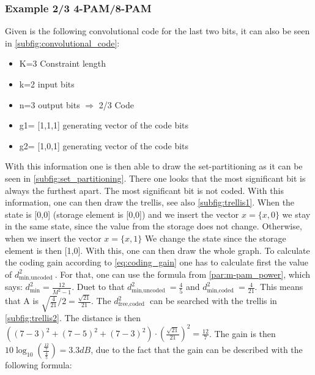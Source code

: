 \subsubsection{Example 2/3 4-PAM/8-PAM}\label{sbusubsec:example_pam}
Given is the following convolutional code for the last two bits, it can also be seen in \autoref{subfig:convolutional_code}:
\begin{itemize}
    \item K=3 Constraint length
    \item k=2 input bits
    \item n=3 output bits $\Rightarrow$ 2/3 Code
    \item g1= [1,1,1] generating vector of the code bits
    \item g2= [1,0,1] generating vector of the code bits
\end{itemize}
With this information one is then able to draw the set-partitioning as it can be seen in \autoref{subfig:set_partitioning}. There one looks that the most significant bit is always the furthest apart. The most significant bit is not coded.\newline
With this information, one can then draw the trellis, see also \autoref{subfig:trellis1}. When the state is [0,0] (storage element is [0,0]) and we insert the vector $x=\{x,0\}$ we stay in the same state, since the value from the storage does not change. Otherwise, when we insert the vector $x=\{x,1\}$ We change the state since the storage element is then [1,0]. With this, one can then draw the whole graph.\newline
To calculate the coding gain according to \autoref{eq:coding_gain} one has to calculate first the value of $d_{\text {min,uncoded }}^2$. For that, one can use the formula from \autoref{par:m-pam_power}, which says: $d_{\min }^2=\frac{12}{M^2-1}$. Duet to that $d_{\text {min,uncoded }}^2=\frac{4}{5}$ and $d_{\text {min,coded }}^2=\frac{4}{21}$. This means that A is $\sqrt{\frac{4}{21}}/2=\frac{\sqrt{21}}{21}$. The $d_{\text {free,coded }}^2$ can be searched with the trellis in \autoref{subfig:trellis2}. The distance is then $\left((7-3)^2+(7-5)^2+(7-3)^2\right)\cdot \left(\frac{\sqrt{21}}{21}\right)^2=\frac{12}{7}$. The gain is then $10\log_{10}(\frac{\frac{12}{7}}{\frac{4}{5}})=3.3dB$, due to the fact that the gain can be described with the following formula:

